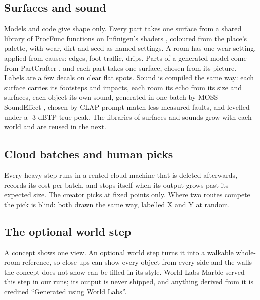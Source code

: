 \subsection{Surfaces and sound}\label{surfaces-and-sound}

Models and code give shape only. Every part takes one surface from a shared library of ProcFunc functions \citep{raistrick2026procfunc} on Infinigen's shaders \citep{raistrick2023infinigen}, coloured from the place's palette, with wear, dirt and seed as named settings. A room has one wear setting, applied from causes: edges, foot traffic, drips. Parts of a generated model come from PartCrafter \citep{lin2025partcrafter}, and each part takes one surface, chosen from its picture. Labels are a few decals on clear flat spots. Sound is compiled the same way: each surface carries its footsteps and impacts, each room its echo from its size and surfaces, each object its own sound, generated in one batch by MOSS-SoundEffect \citep{moss2026}, chosen by CLAP prompt match \citep{wu2022clap} less measured faults, and levelled under a -3 dBTP true peak. The libraries of surfaces and sounds grow with each world and are reused in the next.

\subsection{Cloud batches and human picks}\label{cloud-batches-and-human-picks}

Every heavy step runs in a rented cloud machine that is deleted afterwards, records its cost per batch, and stops itself when its output grows past its expected size. The creator picks at fixed points only. Where two routes compete the pick is blind: both drawn the same way, labelled X and Y at random.

\subsection{The optional world step}\label{the-optional-world-step}

A concept shows one view. An optional world step turns it into a walkable whole-room reference, so close-ups can show every object from every side and the walls the concept does not show can be filled in its style. World Labs Marble served this step in our runs; its output is never shipped, and anything derived from it is credited ``Generated using World Labs''.
